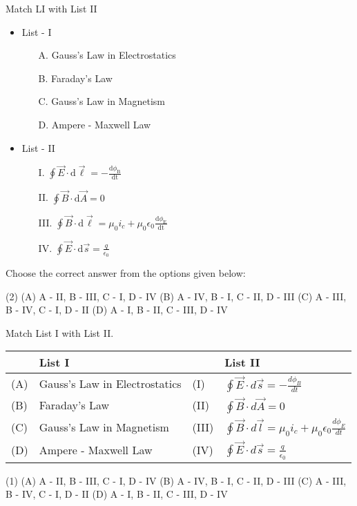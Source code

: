 \item Match LI with List II
\begin{itemize}
    \item List - I
    \begin{itemize}
        \item[A.] Gauss's Law in Electrostatics
        \item[B.] Faraday's Law
        \item[C.] Gauss's Law in Magnetism
        \item[D.] Ampere - Maxwell Law
    \end{itemize}
    \item List - II
    \begin{itemize}
        \item[I.] $\oint \vec{E} \cdot\mathrm{d} \vec{\ell} = -\frac{\mathrm{d} \phi_\mathrm{B}}{\mathrm{dt}}$
        \item[II.] $\oint \vec{B} \cdot\mathrm{d} \vec{A} = 0$
        \item[III.] $\oint \vec{B} \cdot \mathrm{d} \vec{\ell} = \mu_0 i_c + \mu_0 \epsilon_0 \frac{\mathrm{d}\phi_\mathrm{E}}{\mathrm{dt}}$
        \item[IV.] $\oint \vec{E} \cdot \mathrm{d} \vec{s} = \frac{q}{\epsilon_0}$
    \end{itemize}
\end{itemize}
Choose the correct answer from the options given below:
\begin{tasks}(2)
    \task (A) A - II, B - III, C - I, D - IV
    \task (B) A - IV, B - I, C - II, D - III
    \task (C) A - III, B - IV, C - I, D - II
    \task (D) A - I, B - II, C - III, D - IV
\end{tasks}\item Match List I with List II.

\begin{center}
    \renewcommand{\arraystretch}{2}
    \begin{table}[h]
        \centering
        \begin{tabular}{p{0.25cm}p{8cm}|p{0.25cm}p{7cm}}
        \hline
        & List I & & List II \\
        \hline
        (A)& Gauss's Law in Electrostatics & (I) & $\oint \vec{E} \cdot d\vec{s} = - \frac{d\phi_B}{dt}$\\
        (B)& Faraday's Law & (II) & $\oint \vec{B} \cdot d\vec{A} = 0$ \\
        (C)& Gauss's Law in Magnetism & (III) & $\oint \vec{B} \cdot d\vec{l} = \mu_0 i_c + \mu_0 \epsilon_0 \frac{d\phi_E}{dt}$\\
        (D)& Ampere - Maxwell Law & (IV) & $\oint \vec{E} \cdot d\vec{s} = \frac{q}{\epsilon_0}$\\
        \hline
        \end{tabular}
    \end{table}
\end{center}

\begin{tasks}(1)
    \task (A) A - II, B - III, C - I, D - IV
    \task (B) A - IV, B - I, C - II, D - III
    \task (C) A - III, B - IV, C - I, D - II
    \task (D) A - I, B - II, C - III, D - IV
\end{tasks}